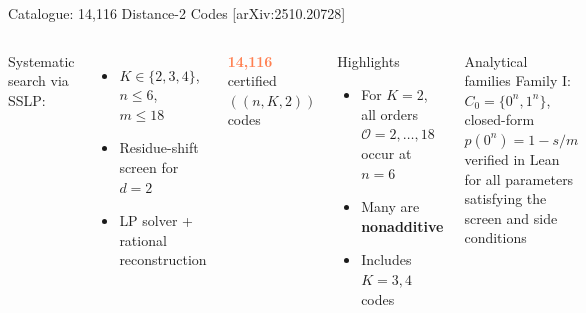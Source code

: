 \documentclass[aspectratio=169,t,10pt]{beamer}
\newcommand{\chk}{\textcolor{Sage}{\checkmark}}
\begin{document}
\begin{frame}{Catalogue: 14,116 Distance-2 Codes
  \hfill{\footnotesize\textcolor{Slate}{[arXiv:2510.20728]}}}

\begin{columns}[T]
Systematic search via SSLP:
\begin{itemize}\setlength\itemsep{1pt}
\item $K\in\{2,3,4\}$, $n\leq 6$, $m\leq 18$
\item Residue-shift screen for $d{=}2$
\item LP solver + rational reconstruction
\end{itemize}

\begin{center}
{\Huge\textcolor{Coral}{\textbf{14,116}}}\\
certified $((n,K,2))$ codes
\end{center}

\begin{block}{Highlights}
\begin{itemize}\setlength\itemsep{1pt}
\item For $K=2$, all orders $\mathcal{O}=2,\dots,18$ occur at $n=6$
\item Many are \textbf{nonadditive}
\item Includes $K=3,4$ codes
\end{itemize}
\end{block}

\begin{exampleblock}{Analytical families}
Family I: $C_0=\{0^n,1^n\}$,\\
closed-form $p(0^n)=1-s/m$\\
\chk\; verified in Lean for all parameters satisfying the screen and side conditions
\end{exampleblock}
\end{columns}
\end{frame}
\end{document}
